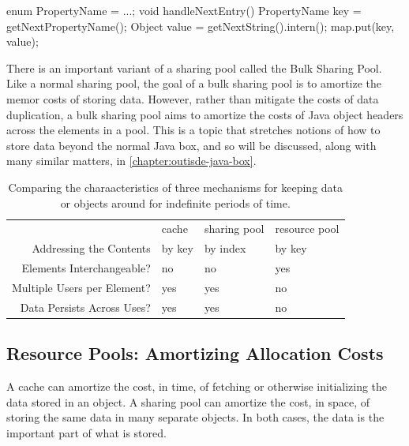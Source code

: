 \begin{shortlisting}
enum PropertyName = {...};
void handleNextEntry() {
	PropertyName key = getNextPropertyName();
	Object value = getNextString().intern();
	map.put(key, value);
}
\end{shortlisting} 



There is an important variant of a sharing pool called the Bulk Sharing Pool.
Like a normal sharing pool, the goal of a bulk sharing pool is to amortize the
memor costs of storing data. However, rather than mitigate the costs of data
duplication, a bulk sharing pool aims to amortize the costs of Java object
headers across the elements in a pool. This is a topic that stretches notions of
how to store data beyond the normal Java box, and so will be discussed, along
with many similar matters, in \autoref{chapter:outisde-java-box}.


\begin{table}
	\centering
	\begin{tabular}{rlll} \toprule
            & cache             & sharing pool & resource pool 
    \\ \cmidrule{2-4}
    Addressing the Contents     & by key       & by index & by key
    \\
        Elements Interchangeable?   & no    & no    & yes
    \\
    Multiple Users per Element? & yes   & yes   & no
    \\
    Data Persists Across Uses?  & yes   & yes   & no
    \\ \bottomrule
    \end{tabular}
	\caption{Comparing the charaacteristics of three mechanisms for keeping data
	or objects around for indefinite periods of time.}
	\label{tab:three-deferred-deletions}
\end{table}

\subsection{Resource Pools: Amortizing Allocation Costs}
\label{sec:resource-pools}

A cache can amortize the cost, in time, of fetching or otherwise initializing the
data stored in an object. A sharing pool can amortize the cost, in space, of
storing the same data in many separate objects. In both cases, the data is the
important part of what is stored.


